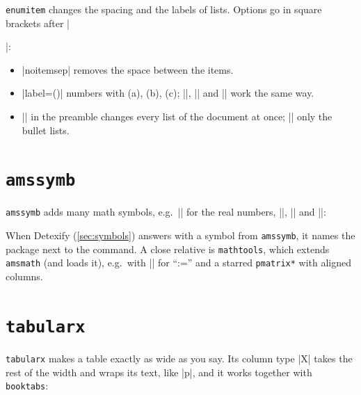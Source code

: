 \texttt{enumitem} changes the spacing and the labels of lists.
Options go in square brackets after \code|\begin{...}|:


\begin{itemize}
    \item \code|noitemsep| removes the space between the items.
    \item \code|label=(\alph*)| numbers with (a), (b), (c);
        \code|\arabic*|, \code|\roman*| and \code|\Alph*| work the same way.
    \item \code|| in the preamble changes every list of the document at once;
        \code|| only the bullet lists.
\end{itemize}

\section{\texttt{amssymb}}\label{sec:amssymb}

\texttt{amssymb} adds many math symbols, e.g.\ \code|| for the real numbers,
\code|\leqslant|, \code|\therefore| and \code|\checkmark|:


When Detexify (\autoref{sec:symbols}) answers with a symbol from \texttt{amssymb},
it names the package next to the command.
A close relative is \texttt{mathtools}, which extends \texttt{amsmath} (and loads it),
e.g.\ with \code|\coloneqq| for \enquote{:=} and a starred \texttt{pmatrix*} with aligned columns.

\section{\texttt{tabularx}}\label{sec:tabularx}

\texttt{tabularx} makes a table exactly as wide as you say.
Its column type \code|X| takes the rest of the width and wraps its text, like \code|p|,
and it works together with \texttt{booktabs}:



\end{...}
